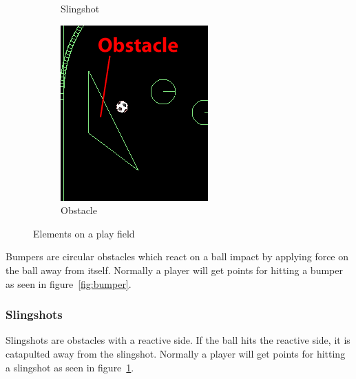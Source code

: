 \documentclass[fontsize=12pt,
               paper=a4,
               twoside=false,
               parskip=half,
               ]{scrartcl}
\begin{document}
\begin{figure}
\begin{subfigure}[b]{0.3\textwidth}
		\caption[Slingshot]{Slingshot}
		\label{fig:slingshot}
	\end{subfigure}
	\quad
	\begin{subfigure}[b]{0.203\textwidth}
		\centering
		\includegraphics[width=\textwidth]{./img/manual/obstacle.png}
		\caption[Obstacle]{Obstacle}
		\label{fig:obstacle}
	\end{subfigure}
	\caption{Elements on a play field}\label{fig:elements}
\end{figure}

Bumpers are circular obstacles which react on a ball impact by applying force on the ball away from itself. Normally a player will get points for hitting a bumper as seen in figure~\ref{fig:bumper}.

\subsubsection{Slingshots}

Slingshots are obstacles with a reactive side. If the ball hits the reactive side, it is catapulted away from the slingshot. Normally a player will get points for hitting a slingshot as seen in figure~\ref{fig:slingshot}.
\end{document}
